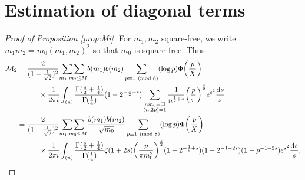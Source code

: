 \documentclass[12pt,reqno]{amsart}
\numberwithin{equation}{section}
\theoremstyle{plain}
\theoremstyle{definition}
\theoremstyle{remark}
\newcommand{\dd}{\mathrm{d}}
\begin{document}
\section{Estimation of diagonal terms}\label{proofofprop1}
\begin{proof}[Proof of Proposition \ref{prop:Mi}]
For $m_1,m_2$ square-free, we write $m_1m_2=m_0(m_1,m_2)^2$ so that $m_0$ is square-free.
Thus
\begin{equation*}
\begin{split}
  \mathcal{M}_2&=
   \frac{2}{(1-\frac{1}{\sqrt{2}})^{2}}
  \underset{m_1,m_2\leq M}{\sum\sum}
  b(m_1)b(m_2)
  \sum_{p\equiv 1\pmod 8 }
  (\log p)\Phi\bigg(\frac{p}{X}\bigg)
  \\
&\hskip 30pt\times
  \frac{1}{2\pi i}
  \int_{(u)}
\frac{\Gamma(\frac{s}{2}+\frac{1}{4})}
{\Gamma(\frac{1}{4})}
(1-2^{-\frac{1}{2}+s})
  \sum_{\substack{nm_0=\square\\(n,2p)=1}}
\frac{1}
{n^{\frac{1}{2}+s}}
\bigg(\frac{p}{\pi}\bigg)^{\frac{s}{2}}
e^{s^2}\frac{\dd s}{s}\\
&=
 \frac{2}{(1-\frac{1}{\sqrt{2}})^{2}}
 \underset{m_1,m_2\leq M}{\sum\sum}
  \frac{b(m_1)b(m_2)}{\sqrt{m_0}}
  \sum_{p\equiv 1\pmod 8 }
  (\log p)\Phi\bigg(\frac{p}{X}\bigg)
  \\
&\hskip 30pt\times
  \frac{1}{2\pi i}
  \int_{(u)}
\frac{\Gamma(\frac{s}{2}+\frac{1}{4})}
{\Gamma(\frac{1}{4})}
\zeta(1+2s)\bigg(\frac{p}{\pi m_0^2}\bigg)^{\frac{s}{2}}
(1-2^{-\frac{1}{2}+s})
(1-2^{-1-2s})
(1-p^{-1-2s})
e^{s^2}\frac{\dd s}{s},
\end{split}
\end{equation*}


\end{proof}
\end{document}
